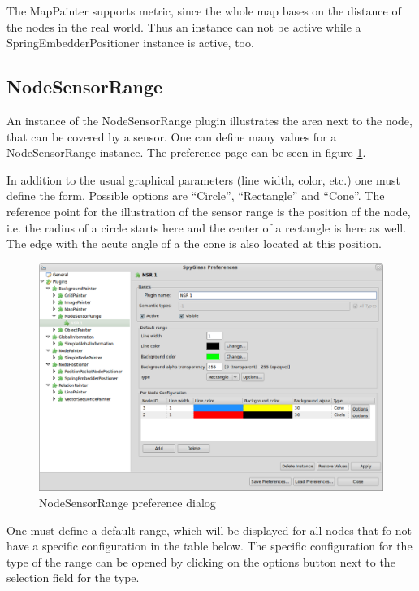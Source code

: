 The MapPainter supports metric, since the whole map bases on the distance of the nodes in the real world. Thus an
instance can not be active while a SpringEmbedderPositioner instance is active, too.

\subsection{NodeSensorRange}

An instance of the NodeSensorRange plugin illustrates the area next to the node, that can be covered by a sensor.
One can define many values for a NodeSensorRange instance. The preference page can be seen in figure \ref{pic:nsr_preferences}.

In addition to the usual graphical parameters (line width, color, etc.) one must define the form. Possible
options are ``Circle'', ``Rectangle'' and ``Cone''.
The reference point for the illustration of the sensor range is the position of the node, i.e. the radius
of a circle starts here and the center of a rectangle is here as well. The edge with the acute angle of a the
cone is also located at this position.

\begin{figure}[htb]
  \begin{center}
    \includegraphics[width=13.2cm]{./pics/nodesensorrange_prefpage}
    \caption{NodeSensorRange preference dialog}
    \label{pic:nsr_preferences}
  \end{center}
\end{figure}

One must define a default range, which will be displayed for all nodes that fo not have a specific configuration in
the table below. The specific configuration for the type of the range can be opened by clicking on the options button
next to the selection field for the type.

